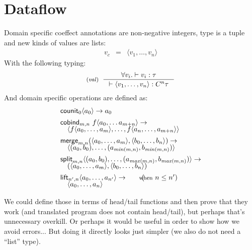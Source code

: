 \documentclass[
		twoside,openright,titlepage,numbers=noenddot,headinclude,%
                footinclude=true,cleardoublepage=empty,
                BCOR=10mm,paper=a4,fontsize=10pt, %
                ngerman,american, %
                ]{scrreprt}
\newcommand{\ident}[1]{\textnormal{\sffamily #1}}
\newcommand{\ctyp}[2]{C^{#1}#2}
\newcommand{\tyrule}[3]{ \inference[\footnotesize{(\emph{#1})}~~]{#2}{#3} }
\begin{document}
\section{Dataflow}
Domain specific coeffect annotations are non-negative integers, type is a tuple and new kinds
of values are lists:
\begin{equation*}
\begin{array}{rcl}
  v_c &  = &  \langle v_1, \ldots, v_n \rangle
\end{array}
\end{equation*}
%
With the following typing:
%
\begin{equation*}  
\tyrule{val}
  { \forall v_i . \vdash v_i : \tau }
  { \vdash \langle v_1, \ldots, v_n \rangle : \ctyp{n}{\tau} }
\end{equation*}
%
And domain specific operations are defined as:
%
\begin{equation*}
\begin{array}{l}
\ident{counit}_{0}\langle a_0 \rangle \rightarrow a_0
\\[0.45em]
\ident{cobind}_{m, n}~f \langle a_0, \ldots a_{m+n} \rangle \rightarrow
\\[-0.25em]
\quad \langle f \langle a_0, \ldots, a_m \rangle, \ldots, f \langle a_{n}, \ldots, a_{m+n} \rangle \rangle
\\[0.45em]
\ident{merge}_{m, n} (\langle a_0, \ldots, a_m \rangle, \langle b_0, \ldots, b_n\rangle) \rightarrow
\\[-0.25em]
\quad \langle (a_0, b_0), \ldots, (a_{\mathit{min}(m,n)}, b_{\mathit{min}(m,n)}) \rangle
\\[0.45em]
\ident{split}_{m, n} \langle (a_0, b_0), \ldots, (a_{\mathit{max}(m,n)}, b_{\mathit{max}(m,n)}) \rangle  \rightarrow
\\[-0.25em]
\quad (\langle a_0, \ldots, a_m \rangle, \langle b_0, \ldots, b_n\rangle)
\\[0.45em]
\ident{lift}_{n', n} \langle a_0, \ldots, a_{n'} \rangle \rightarrow
\qquad(\hspace{-0.75em}\textnormal{\footnotesize when}~n\leq n') \\[-0.25em]
\quad \langle a_0, \ldots, a_n \rangle
\end{array}
\end{equation*}

We could define those in terms of head/tail functions and then prove that they work (and translated
program does not contain head/tail), but perhaps that's unnecessary overkill. Or perhaps it would
be useful in order to show how we avoid errors... But doing it directly looks just simpler (we
also do not need a ``list'' type).
\end{document}
